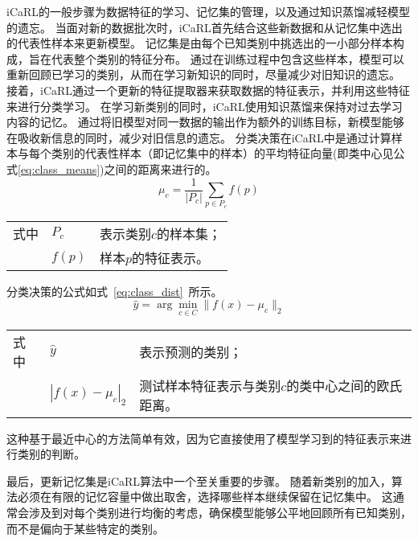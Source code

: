 iCaRL的一般步骤为数据特征的学习、记忆集的管理，以及通过知识蒸馏减轻模型的遗忘。
当面对新的数据批次时，iCaRL首先结合这些新数据和从记忆集中选出的代表性样本来更新模型。
记忆集是由每个已知类别中挑选出的一小部分样本构成，旨在代表整个类别的特征分布。
通过在训练过程中包含这些样本，模型可以重新回顾已学习的类别，从而在学习新知识的同时，尽量减少对旧知识的遗忘。
接着，iCaRL通过一个更新的特征提取器来获取数据的特征表示，并利用这些特征来进行分类学习。
在学习新类别的同时，iCaRL使用知识蒸馏来保持对过去学习内容的记忆。
通过将旧模型对同一数据的输出作为额外的训练目标，新模型能够在吸收新信息的同时，减少对旧信息的遗忘。
分类决策在iCaRL中是通过计算样本与每个类别的代表性样本（即记忆集中的样本）的平均特征向量(即类中心见公式\ref{eq:class_means})之间的距离来进行的。
\begin{equation}
	\label{eq:class_means}
	\mu_c = \frac{1}{|P_c|} \sum_{p \in P_c} f(p)
\end{equation}
\begin{flushleft}
	\renewcommand\arraystretch{1.25}
	\begin{tabularx}{\textwidth}{@{}>{\normalsize\rm}l@{\quad}>{\normalsize\rm}l@{——}>{\normalsize\rm}X@{}}
		式中 & $P_c$  & 表示类别$c$的样本集； \\
		     & $f(p)$ & 样本$p$的特征表示。   \\
	\end{tabularx}\vspace{.5ex}
\end{flushleft}
分类决策的公式如式~\ref{eq:class_dist}~所示。
\begin{equation}
	\label{eq:class_dist}
	\hat{y} = \arg\min_{c \in C} \|f(x) - \mu_c\|_2
\end{equation}
\begin{flushleft}
	\renewcommand\arraystretch{1.25}
	\begin{tabularx}{\textwidth}{@{}>{\normalsize\rm}l@{\quad}>{\normalsize\rm}l@{——}>{\normalsize\rm}X@{}}
		式中 & $\hat{y}$          & 表示预测的类别；                                  \\
		     & $|f(x) - \mu_c|_2$ & 测试样本特征表示与类别$c$的类中心之间的欧氏距离。 \\
	\end{tabularx}\vspace{.5ex}
\end{flushleft}
这种基于最近中心的方法简单有效，因为它直接使用了模型学习到的特征表示来进行类别的判断。

最后，更新记忆集是iCaRL算法中一个至关重要的步骤。
随着新类别的加入，算法必须在有限的记忆容量中做出取舍，选择哪些样本继续保留在记忆集中。
这通常会涉及到对每个类别进行均衡的考虑，确保模型能够公平地回顾所有已知类别，而不是偏向于某些特定的类别。\par

